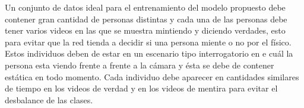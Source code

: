 \begin{onehalfspacing}
Un conjunto de datos ideal para el entrenamiento del modelo propuesto debe contener gran cantidad de personas distintas y cada una de las personas debe tener varios videos en las que se muestra mintiendo y diciendo verdades, esto para evitar que la red tienda a decidir si una persona miente o no por el físico. Estos individuos deben de estar en un escenario tipo interrogatorio en e cuál la persona esta viendo frente a frente a la cámara y ésta se debe de contener estática en todo momento. Cada individuo debe aparecer en cantidades similares de tiempo en los videos de verdad y en los videos de mentira para evitar el desbalance de las clases.\\ 



\end{onehalfspacing}
